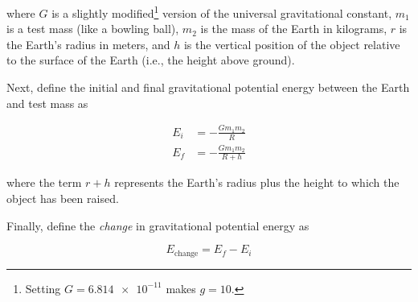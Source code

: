 \documentclass[]{exam}
\begin{document}
\begin{questions}
where $G$ is a slightly modified\footnote{Setting $G = \num{6.814e-11}$ makes $g = 10$.} version of the universal gravitational constant, $m_1$ is a test mass (like a bowling ball), $m_2$ is the mass of the Earth in kilograms, $r$ is the Earth's radius in meters, and $h$ is the vertical position of the object relative to the surface of the Earth (i.e., the height above ground). 

Next, define the initial and final gravitational potential energy between the Earth and test mass as

\begin{align*}
    E_i &= -\frac{G m_1 m_2}{R} \\[1ex]
    E_f &= - \frac{G m_1 m_2}{R+h}
\end{align*}

where the term $r+h$ represents the Earth's radius plus the height to which the object has been raised.

Finally, define the \textit{change} in gravitational potential energy as

\begin{equation*}
    E_{\mathrm{change}} = E_f - E_i
\end{equation*}

\end{questions}
\end{document}
